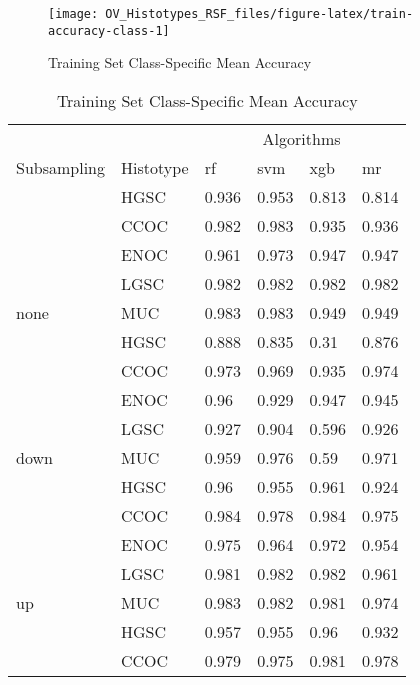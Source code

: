 \documentclass[
]{report}
\begin{document}
\begin{figure}[H]

{\centering \texttt{[image: OV\_Histotypes\_RSF\_files/figure-latex/train-accuracy-class-1]} 

}

\caption{Training Set Class-Specific Mean Accuracy}\label{fig:train-accuracy-class}
\end{figure}

\begin{table}

\caption{\label{tab:train-accuracy-class-table}Training Set Class-Specific Mean Accuracy}
\centering
\begin{tabular}[t]{l|l|l|l|l|l}
\hline
\multicolumn{2}{c|}{ } & \multicolumn{4}{c}{Algorithms} \\
\cline{3-6}
Subsampling & Histotype & rf & svm & xgb & mr\\
\hline
 & HGSC & 0.936 & 0.953 & 0.813 & 0.814\\
\cline{2-6}
 & CCOC & 0.982 & 0.983 & 0.935 & 0.936\\
\cline{2-6}
 & ENOC & 0.961 & 0.973 & 0.947 & 0.947\\
\cline{2-6}
 & LGSC & 0.982 & 0.982 & 0.982 & 0.982\\
\cline{2-6}
\multirow{-5}{*}{\raggedright\arraybackslash none} & MUC & 0.983 & 0.983 & 0.949 & 0.949\\
\cline{1-6}
 & HGSC & 0.888 & 0.835 & 0.31 & 0.876\\
\cline{2-6}
 & CCOC & 0.973 & 0.969 & 0.935 & 0.974\\
\cline{2-6}
 & ENOC & 0.96 & 0.929 & 0.947 & 0.945\\
\cline{2-6}
 & LGSC & 0.927 & 0.904 & 0.596 & 0.926\\
\cline{2-6}
\multirow{-5}{*}{\raggedright\arraybackslash down} & MUC & 0.959 & 0.976 & 0.59 & 0.971\\
\cline{1-6}
 & HGSC & 0.96 & 0.955 & 0.961 & 0.924\\
\cline{2-6}
 & CCOC & 0.984 & 0.978 & 0.984 & 0.975\\
\cline{2-6}
 & ENOC & 0.975 & 0.964 & 0.972 & 0.954\\
\cline{2-6}
 & LGSC & 0.981 & 0.982 & 0.982 & 0.961\\
\cline{2-6}
\multirow{-5}{*}{\raggedright\arraybackslash up} & MUC & 0.983 & 0.982 & 0.981 & 0.974\\
\cline{1-6}
 & HGSC & 0.957 & 0.955 & 0.96 & 0.932\\
\cline{2-6}
 & CCOC & 0.979 & 0.975 & 0.981 & 0.978\\

\end{tabular}
\end{table}
\end{document}
